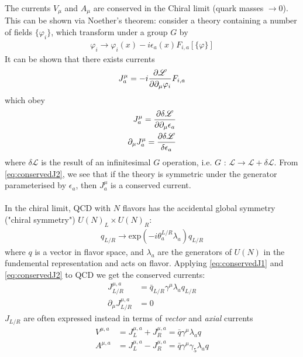 \documentclass[a4paper,10pt]{article}
\numberwithin{equation}{section}
\begin{document}
The currents $V_{\mu}$ and $A_{\mu}$ are conserved in the Chiral limit (quark masses $\rightarrow 0$). This can be shown via Noether's theorem: consider a theory containing a number of fields $\{\varphi_i\}$, which transform under a group $G$ by
\begin{align}
	\varphi_i \rightarrow \varphi_i (x) - i\epsilon_a (x) F_{i,a}[\{\varphi\}]
\end{align}
It can be shown that there exists currents
\begin{align}
	J_a^{\mu} = -i{\partial \mathscr{L} \over \partial\partial_{\mu} \varphi_i} F_{i,a}
\end{align}
which obey
\begin{align}
	\label{eq:conservedJ1}
	J^{\mu}_a = {\partial \delta \mathscr{L} \over \partial \partial_{\mu} \epsilon_a } \\
	\partial_{\mu} J^{\mu}_a = {\partial \delta \mathscr{L} \over \delta \epsilon_a}	
	\label{eq:conservedJ2}
\end{align}
where $\delta\mathscr{L}$ is the result of an infinitesimal $G$ operation, i.e. $G$ : $\mathscr{L} \rightarrow \mathscr{L} + \delta\mathscr{L}$. From \eqref{eq:conservedJ2}, we see that if the theory is symmetric under the generator parameterised by $\epsilon_a$, then $J_a^{\mu}$ is a conserved current.
\\ \\
In the chiral limit, QCD with $N$ flavors has the accidental global symmetry ("chiral symmetry") $U(N)_L\times U(N)_R$:
\begin{align}
	q_{L/R} \rightarrow \text{exp}(-i\theta_a^{L/R} \lambda_a) q_{L/R}
	\label{eq:LRtransform}
\end{align} 
where $q$ is a vector in flavor space, and $\lambda_a$ are the generators of $U(N)$ in the fundemental representation and acts on flavor. Applying \eqref{eq:conservedJ1} and \eqref{eq:conservedJ2} to QCD we get the conserved currents:
\begin{align}
	J_{L/R}^{\mu,a} &= \bar{q}_{L/R} \gamma^{\mu} \lambda_a q_{L/R} \\
	\partial_{\mu} J_{L/R}^{\mu,a} &= 0
\end{align}
$J_{L/R}$ are often expressed instead in terms of {\it{vector}} and {\it{axial}} currents
\begin{align}
	V^{\mu,a} &= J^{\mu,a}_L + J^{\mu,a}_R = \bar{q} \gamma^{\mu} \lambda_a q \\
	A^{\mu,a} &= J^{\mu,a}_L - J^{\mu,a}_R = \bar{q} \gamma^{\mu} \gamma_5 \lambda_a q
\end{align}
\end{document}
